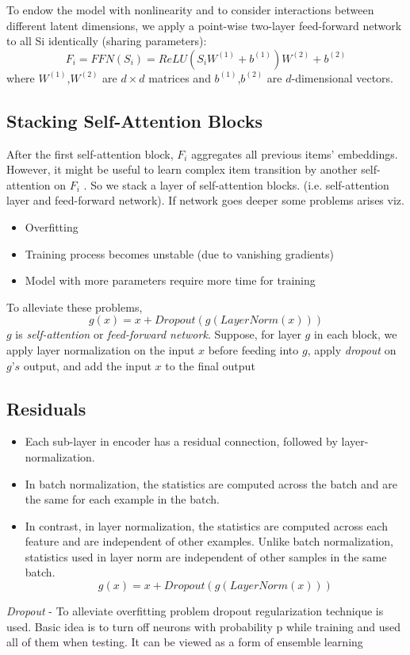 \documentclass[11pt]{article}
\begin{document}
	To endow the model with nonlinearity and to consider interactions
between different latent dimensions, we apply a point-wise
two-layer feed-forward network to all Si identically (sharing
parameters):
\[ F_{i} = FFN(S_{i}) = ReLU(S_{i}W^{(1)} + b^{(1)})W^{(2)} + b^{(2)} \]
where $W^{(1)}$,$W^{(2)}$ are $d \times d$ matrices and $b^{(1)}$,$b^{(2)}$ are $d$-dimensional vectors.

\subsection{Stacking Self-Attention Blocks}
After the first self-attention block, $F_{i}$ aggregates all previous items’ embeddings. However, it might be useful to learn complex item transition by another self-attention on $F_{i}$ . So we stack a layer of self-attention blocks. (i.e. self-attention layer and feed-forward network).
If network goes deeper some problems arises viz.
\begin{itemize}
	\item Overfitting
	\item Training process becomes unstable (due to vanishing gradients)
	\item Model with more parameters require more time for training
\end{itemize}
To alleviate these problems,
            	  \[g(x) = x + Dropout(g(LayerNorm(x)))\]	
 	$g$ is \textit{self-attention} or \textit{feed-forward network}.
           	Suppose, for layer $g$ in each block, we apply layer normalization on the input $x$ before feeding into $g$, apply \textit{dropout} on $g’s$ output, and add the input $x$ to the final output

\subsection{Residuals}
	\begin{itemize}
		\item Each sub-layer in encoder has a residual connection, followed by layer-normalization\cite{kkurita}.
		\item In batch normalization, the statistics are computed across the batch and are the same for each example in the batch.
		\item In contrast, in layer normalization, the statistics are computed across each feature and are independent of other examples. Unlike batch normalization, statistics used in layer norm are independent of other samples in the same batch.
			\[ g(x) = x + Dropout(g(LayerNorm(x))) \]
	\end{itemize}  
\quad \emph{Dropout} - 
            	To alleviate overfitting problem dropout regularization technique is used. Basic idea is to turn off neurons with probability p while training and used all of them when testing. It can be viewed as a form of ensemble learning
\end{document}
